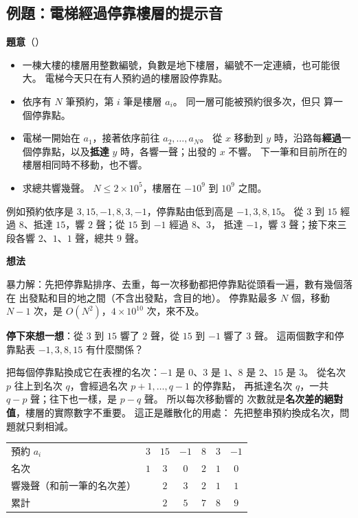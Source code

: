 \subsection{例題：電梯經過停靠樓層的提示音}
\label{sec:srt-ex-chimes}

\textbf{題意}（）

\begin{itemize}
\item 一棟大樓的樓層用整數編號，負數是地下樓層，編號不一定連續，也可能很大。
電梯今天只在有人預約過的樓層設停靠點。
\item 依序有 $N$ 筆預約，第 $i$ 筆是樓層 $a_i$。 同一層可能被預約很多次，但只
算一個停靠點。
\item 電梯一開始在 $a_1$，接著依序前往 $a_2, \ldots, a_N$。 從 $x$ 移動到 $y$
時，沿路每\textbf{經過}一個停靠點，以及\textbf{抵達} $y$ 時，各響一聲；出發的
$x$ 不響。 下一筆和目前所在的樓層相同時不移動，也不響。
\item 求總共響幾聲。 $N \le 2 \times 10^5$，樓層在 $-10^9$ 到 $10^9$ 之間。
\end{itemize}

例如預約依序是 $3, 15, -1, 8, 3, -1$，停靠點由低到高是 $-1, 3, 8, 15$。 從
$3$ 到 $15$ 經過 $8$、抵達 $15$，響 $2$ 聲；從 $15$ 到 $-1$ 經過 $8$、$3$，
抵達 $-1$，響 $3$ 聲；接下來三段各響 $2$、$1$、$1$ 聲，總共 $9$ 聲。

\textbf{想法}

暴力解：先把停靠點排序、去重，每一次移動都把停靠點從頭看一遍，數有幾個落在
出發點和目的地之間（不含出發點，含目的地）。 停靠點最多 $N$ 個，移動 $N - 1$
次，是 $O(N^2)$，$4 \times 10^{10}$ 次，來不及。

\textbf{停下來想一想}：從 $3$ 到 $15$ 響了 $2$ 聲，從 $15$ 到 $-1$ 響了
$3$ 聲。 這兩個數字和停靠點表 $-1, 3, 8, 15$ 有什麼關係？

把每個停靠點換成它在表裡的名次：$-1$ 是 $0$、$3$ 是 $1$、$8$ 是 $2$、$15$ 是
$3$。 從名次 $p$ 往上到名次 $q$，會經過名次 $p + 1, \ldots, q - 1$ 的停靠點，
再抵達名次 $q$，一共 $q - p$ 聲；往下也一樣，是 $p - q$ 聲。 所以每次移動響的
次數就是\textbf{名次差的絕對值}，樓層的實際數字不重要。 這正是離散化的用處：
先把整串預約換成名次，問題就只剩相減。

\begin{center}
\begin{tabular}{lcccccc}
\toprule
預約 $a_i$ & $3$ & $15$ & $-1$ & $8$ & $3$ & $-1$ \\
名次 & $1$ & $3$ & $0$ & $2$ & $1$ & $0$ \\
響幾聲（和前一筆的名次差） & & $2$ & $3$ & $2$ & $1$ & $1$ \\
累計 & & $2$ & $5$ & $7$ & $8$ & $9$ \\
\bottomrule
\end{tabular}
\end{center}

